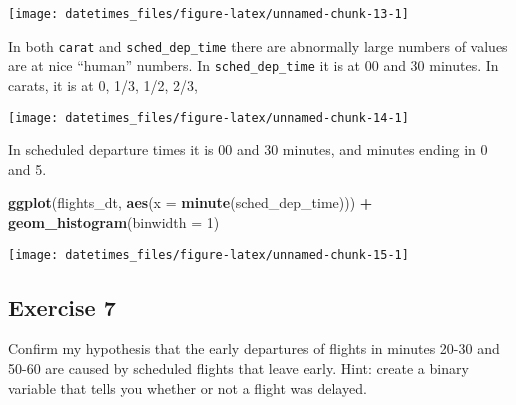 \documentclass[]{book}
\newenvironment{Shaded}{\begin{snugshade}}{\end{snugshade}}
\newcommand{\DataTypeTok}[1]{\textcolor[rgb]{0.13,0.29,0.53}{#1}}
\newcommand{\DecValTok}[1]{\textcolor[rgb]{0.00,0.00,0.81}{#1}}
\newcommand{\KeywordTok}[1]{\textcolor[rgb]{0.13,0.29,0.53}{\textbf{#1}}}
\newcommand{\NormalTok}[1]{#1}
\newcommand{\OperatorTok}[1]{\textcolor[rgb]{0.81,0.36,0.00}{\textbf{#1}}}
\newcommand{\StringTok}[1]{\textcolor[rgb]{0.31,0.60,0.02}{#1}}
\theoremstyle{plain}
\theoremstyle{remark}
\theoremstyle{definition}
\theoremstyle{definition}
\theoremstyle{definition}
\theoremstyle{remark}
\begin{document}
\begin{center}\texttt{[image: datetimes\_files/figure-latex/unnamed-chunk-13-1]} \end{center}

In both \texttt{carat} and \texttt{sched\_dep\_time} there are
abnormally large numbers of values are at nice ``human'' numbers. In
\texttt{sched\_dep\_time} it is at 00 and 30 minutes. In carats, it is
at 0, 1/3, 1/2, 2/3,

\begin{Shaded}
\end{Shaded}

\begin{center}\texttt{[image: datetimes\_files/figure-latex/unnamed-chunk-14-1]} \end{center}

In scheduled departure times it is 00 and 30 minutes, and minutes ending
in 0 and 5.

\begin{Shaded}
\begin{Highlighting}[]
\KeywordTok{ggplot}\NormalTok{(flights_dt, }\KeywordTok{aes}\NormalTok{(}\DataTypeTok{x =} \KeywordTok{minute}\NormalTok{(sched_dep_time))) }\OperatorTok{+}
\StringTok{  }\KeywordTok{geom_histogram}\NormalTok{(}\DataTypeTok{binwidth =} \DecValTok{1}\NormalTok{)}
\end{Highlighting}
\end{Shaded}

\begin{center}\texttt{[image: datetimes\_files/figure-latex/unnamed-chunk-15-1]} \end{center}

\hypertarget{exercise-7-3}{%
\subsection{Exercise 7}\label{exercise-7-3}}

Confirm my hypothesis that the early departures of flights in minutes
20-30 and 50-60 are caused by scheduled flights that leave early. Hint:
create a binary variable that tells you whether or not a flight was
delayed.
\end{document}
